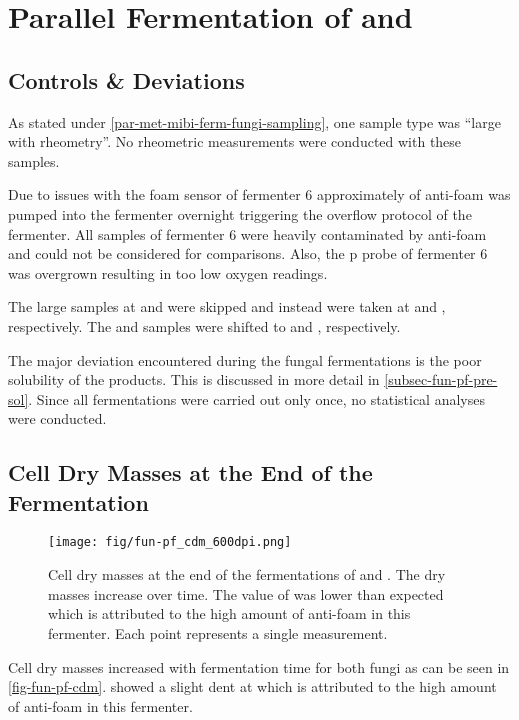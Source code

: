 \section{Parallel Fermentation of \rolf{} and \comm{}\label{sec-fun-pf}}
\subsection{Controls \& Deviations}
As stated under \vref{par-met-mibi-ferm-fungi-sampling}, one sample type was \enquote{large with rheometry}. No rheometric measurements were conducted with these samples.

Due to issues with the foam sensor of fermenter 6 approximately  of anti-foam was pumped into the fermenter overnight triggering the overflow protocol of the fermenter. All samples of fermenter 6 were heavily contaminated by anti-foam and could not be considered for comparisons. Also, the p probe of fermenter 6 was overgrown resulting in too low oxygen readings.

The large samples at  and  were skipped and instead were taken at  and , respectively. The  and  samples were shifted to  and , respectively.

The major deviation encountered during the fungal fermentations is the poor solubility of the products. This is discussed in more detail in \vref{subsec-fun-pf-pre-sol}. Since all fermentations were carried out only once, no statistical analyses were conducted.

\subsection{Cell Dry Masses at the End of the Fermentation}
\begin{figure}
	\begin{center}
		\texttt{[image: fig/fun-pf\_cdm\_600dpi.png]}
		\caption[Fungal Fermentation Cell Dry Mass Courses]{Cell dry masses at the end of the fermentations of \rolf{} and \comm{}. The dry masses increase over time. The  value of \comm{} was lower than expected which is attributed to the high amount of anti-foam in this fermenter. Each point represents a single measurement.\label{fig-fun-pf-cdm}}
	\end{center}
\end{figure}

Cell dry masses increased with fermentation time for both fungi as can be seen in \vref{fig-fun-pf-cdm}. \comm{} showed a slight dent at  which is attributed to the high amount of anti-foam in this fermenter.

